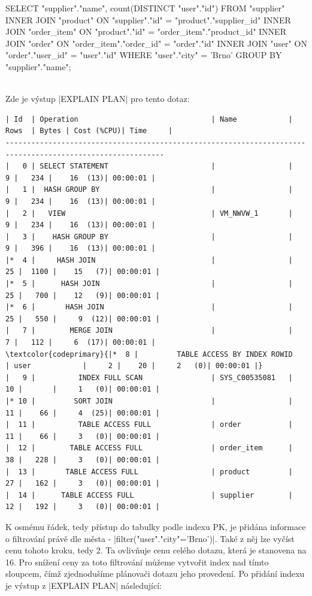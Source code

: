 \documentclass[12pt,a4paper]{article}
\makeatletter
\newcommand\ic[1][green]{%
    \@testopt{\@ic{#1}}{-#1}%
}
\def\@ic#1[#2]{%
    \Collectverb{\@@ic{#1}{#2}}%
}
\def\@@ic#1#2#3{%
    {\lstinline[basicstyle=\ttfamily\color{codeprimary},breaklines=true]|#3|}%
}
\makeatother
\begin{document}
	\begin{code}
SELECT
  "supplier"."name",
  count(DISTINCT "user"."id")
FROM "supplier"
  INNER JOIN "product"
  	ON "supplier"."id" = "product"."supplier_id"
  INNER JOIN "order_item"
  	ON "product"."id" = "order_item"."product_id"
  INNER JOIN "order"
  	ON "order_item"."order_id" = "order"."id"
  INNER JOIN "user"
  	ON "order"."user_id" = "user"."id"
  WHERE "user"."city" = 'Brno'
GROUP BY "supplier"."name";
	\end{code}\\

	Zde je výstup \ic|EXPLAIN PLAN| pro tento dotaz:

	{\scriptsize
	\begin{Verbatim}[commandchars=\\\{\}]
| Id  | Operation                               | Name            | Rows  | Bytes | Cost (%CPU)| Time     |
-----------------------------------------------------------------------------------------------------------
|   0 | SELECT STATEMENT                        |                 |     9 |   234 |    16  (13)| 00:00:01 |
|   1 |  HASH GROUP BY                          |                 |     9 |   234 |    16  (13)| 00:00:01 |
|   2 |   VIEW                                  | VM_NWVW_1       |     9 |   234 |    16  (13)| 00:00:01 |
|   3 |    HASH GROUP BY                        |                 |     9 |   396 |    16  (13)| 00:00:01 |
|*  4 |     HASH JOIN                           |                 |    25 |  1100 |    15   (7)| 00:00:01 |
|*  5 |      HASH JOIN                          |                 |    25 |   700 |    12   (9)| 00:00:01 |
|*  6 |       HASH JOIN                         |                 |    25 |   550 |     9  (12)| 00:00:01 |
|   7 |        MERGE JOIN                       |                 |     7 |   112 |     6  (17)| 00:00:01 |
\textcolor{codeprimary}{|*  8 |         TABLE ACCESS BY INDEX ROWID     | user            |     2 |    20 |     2   (0)| 00:00:01 |}
|   9 |          INDEX FULL SCAN                | SYS_C00535081   |    10 |       |     1   (0)| 00:00:01 |
|* 10 |         SORT JOIN                       |                 |    11 |    66 |     4  (25)| 00:00:01 |
|  11 |          TABLE ACCESS FULL              | order           |    11 |    66 |     3   (0)| 00:00:01 |
|  12 |        TABLE ACCESS FULL                | order_item      |    38 |   228 |     3   (0)| 00:00:01 |
|  13 |       TABLE ACCESS FULL                 | product         |    27 |   162 |     3   (0)| 00:00:01 |
|  14 |      TABLE ACCESS FULL                  | supplier        |    12 |   192 |     3   (0)| 00:00:01 |
	\end{Verbatim}
}
	K osmému řádek, tedy přístup do tabulky podle indexu PK, je přidána informace o filtrování právě dle města - \ic|filter("user"."city"='Brno')|. Také z něj lze vyčíst cenu tohoto kroku, tedy 2. Ta ovlivňuje cenu celého dotazu, která je stanovena na 16. Pro snížení ceny za toto filtrování můžeme vytvořit index nad tímto sloupcem, čímž zjednodušíme plánovači dotazu jeho provedení. Po přidání indexu je výstup z \ic|EXPLAIN PLAN| následující:
\end{document}
